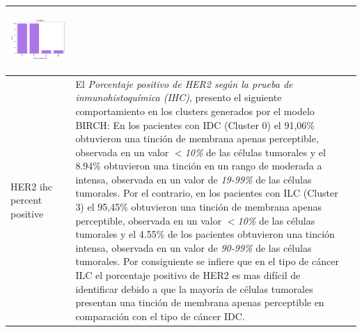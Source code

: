 \begin{table}[htb!]
\begin{threeparttable}
\begin{tabular}{p{2.5cm} p{7cm} p{6.5cm}}
			\begin{center}\includegraphics[width=1\linewidth]{NOTEBOOK/IMAGENES_BIRCH_CLUSTERING/4_Cluster_3_tumor_stage_code}\end{center}
			
			\\ \hline
			HER2 ihc percent positive
			& El \textit{Porcentaje positivo de HER2 según la prueba de inmunohistoquímica (IHC)}, presento el siguiente comportamiento en los clusters generados por el modelo BIRCH: En los pacientes con IDC (Cluster 0) el 91,06\%  obtuvieron una tinción de membrana apenas perceptible, observada en un valor $<$\textit{10\%} de las células tumorales y el 8.94\% obtuvieron una tinción en un rango de moderada a intensa, observada en un valor de \textit{19-99\%} de las células tumorales. Por el contrario, en los pacientes con ILC (Cluster 3) el 95,45\%  obtuvieron una tinción de membrana apenas perceptible, observada en un valor $<$\textit{10\%} de las células tumorales y el 4.55\% de los pacientes obtuvieron una tinción intensa, observada en un valor de \textit{90-99\%} de las células tumorales. Por consiguiente se infiere que en el tipo de cáncer ILC el porcentaje positivo de HER2 es mas difícil de identificar debido a que la mayoría de células tumorales presentan una tinción de membrana apenas perceptible en comparación con el tipo de cáncer IDC.
			

\end{tabular}
\end{threeparttable}
\end{table}
